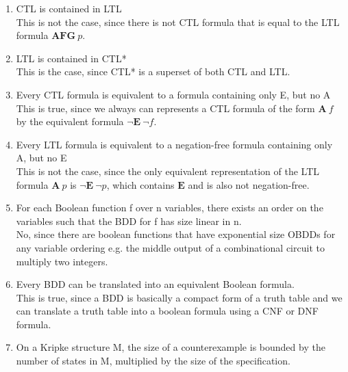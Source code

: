 \documentclass[a4paper, 11pt]{article}
\begin{document}
\begin{enumerate}[label=(\alph*)]
    \item CTL is contained in LTL\\

    This is not the case, since there is not CTL formula that is equal to the LTL formula $\mathbf{AFG}~p$.

    \item LTL is contained in CTL*\\

    This is the case, since CTL* is a superset of both CTL and LTL.

    \item Every CTL formula is equivalent to a formula containing only E, but no A\\

    This is true, since we always can represents a CTL formula of the form $\mathbf{A}~f$ by the equivalent formula $¬\mathbf{E}~¬f$.

    \item Every LTL formula is equivalent to a negation-free formula containing only A, but no E\\

    This is not the case, since the only equivalent representation of the LTL formula $\mathbf{A}~p$ is $¬\mathbf{E}~¬p$, which contains $\mathbf{E}$ and is also not negation-free.

    \item For each Boolean function f over n variables, there exists an order on the variables such that the BDD for f has size linear in n.\\

    No, since there are boolean functions that have exponential size OBDDs for any variable ordering e.g. the middle output of a combinational circuit to multiply two integers.

    \item Every BDD can be translated into an equivalent Boolean formula.\\

    This is true, since a BDD is basically a compact form of a truth table and we can translate a truth table into a boolean formula using a CNF or DNF formula.

    \item On a Kripke structure M, the size of a counterexample is bounded by the number of states in M, multiplied by the size of the specification.\\


\end{enumerate}
\end{document}
